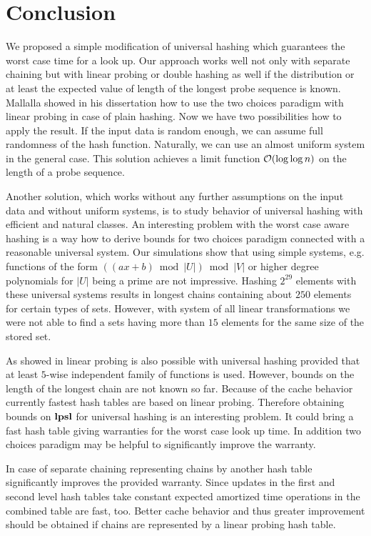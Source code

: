 \section{Conclusion}
\label{section-conclusion}
We proposed a simple modification of universal hashing which guarantees the worst case time for a look up. Our approach works well not only with separate chaining but with linear probing or double hashing as well if the distribution or at least the expected value of length of the longest probe sequence is known. Mallalla showed in his dissertation \cite{Malalla:2004:THS:1124034} how to use the two choices paradigm with linear probing in case of plain hashing. Now we have two possibilities how to apply the result. If the input data is random enough, we can assume full randomness of the hash function. Naturally, we can use an almost uniform system in the general case. This solution achieves a limit function $\mathcal{O}(\log \log n)$ on the length of a probe sequence.

Another solution, which works without any further assumptions on the input data and without uniform systems, is to study behavior of universal hashing with efficient and natural classes. An interesting problem with the worst case aware hashing is a way how to derive bounds for two choices paradigm connected with a reasonable universal system. Our simulations show that using simple systems, e.g. functions of the form $((ax + b) \bmod |U|) \bmod |V|$ or higher degree polynomials for $|U|$ being a prime are not impressive. Hashing $2^{29}$ elements with these universal systems results in longest chains containing about $250$ elements for certain types of sets. However, with system of all linear transformations we were not able to find a sets having more than $15$ elements for the same size of the stored set.

As showed in \cite{DBLP:conf/alenex/ThorupZ10} linear probing is also possible with universal hashing provided that at least $5$-wise independent family of functions is used. However, bounds on the length of the longest chain are not known so far. Because of the cache behavior currently fastest hash tables are based on linear probing. Therefore obtaining bounds on $\mathbf{lpsl}$ for universal hashing is an interesting problem. It could bring a fast hash table giving warranties for the worst case look up time. In addition two choices paradigm may be helpful to significantly improve the warranty.

In case of separate chaining representing chains by another hash table significantly improves the provided warranty. Since updates in the first and second level hash tables take constant expected amortized time operations in the combined table are fast, too. Better cache behavior and thus greater improvement should be obtained if chains are represented by a linear probing hash table.